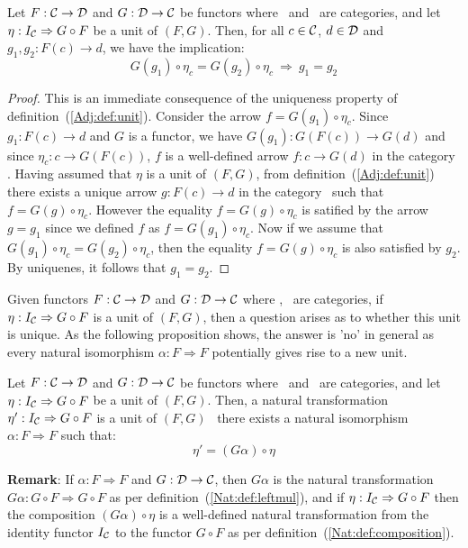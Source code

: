 \begin{prop}\label{Adj:prop:unit:proving:equality}
    Let $F:\mbox{$\cal C$}\to\mbox{$\cal D$}$ and $G:\mbox{$\cal D$}\to\mbox{$\cal C$}$ be functors where \Cat\ and \Dat\ 
    are categories, and let $\eta:I_{\cal C}\Rightarrow G\circ F$ be a unit 
    of $(F,G)$. Then, for all $c\in\mbox{$\cal C$}$, $d\in\mbox{$\cal D$}$ and $g_{1},g_{2}:F(c)\to d$,
    we have the implication:
        \[
            G(g_{1})\circ\eta_{c} = G(g_{2})\circ\eta_{c}\ 
            \Rightarrow\ 
            g_{1}=g_{2}
        \]
\end{prop}
\begin{proof}
    This is an immediate consequence of the uniqueness property of
    definition~(\ref{Adj:def:unit}). Consider the arrow 
    $f=G(g_{1})\circ\eta_{c}$. Since $g_{1}:F(c)\to d$ and $G$ is a 
    functor, we have 
    $G(g_{1}):G(F(c))\to G(d)$ and since $\eta_{c}:c\to G(F(c))$, $f$
    is a well-defined arrow $f:c\to G(d)$ in the category \Cat. Having
    assumed that $\eta$ is a unit of $(F,G)$, from 
    definition~(\ref{Adj:def:unit}) there exists a unique arrow 
    $g:F(c)\to d$ in the category \Dat\ such that $f=G(g)\circ\eta_{c}$.
    However the equality $f=G(g)\circ\eta_{c}$ is satified by the 
    arrow $g=g_{1}$ since we defined $f$ as $f=G(g_{1})\circ\eta_{c}$.
    Now if we assume that $G(g_{1})\circ\eta_{c}=G(g_{2})\circ\eta_{c}$,
    then the equality $f=G(g)\circ\eta_{c}$ is also satisfied by $g_{2}$.
    By uniquenes, it follows that $g_{1}=g_{2}$.
\end{proof}

Given functors $F:\mbox{$\cal C$}\to\mbox{$\cal D$}$ and $G:\mbox{$\cal D$}\to\mbox{$\cal C$}$ where \Cat, \Dat\ are 
categories, if $\eta:I_{\cal C}\Rightarrow G\circ F$ is a unit of $(F,G)$,
then a question arises as to whether this unit is unique. As the following
proposition shows, the answer is 'no' in general as every natural 
isomorphism $\alpha : F\Rightarrow F$ potentially gives rise to a 
new unit.

\begin{prop}\label{Adj:prop:unit:not:unique}
    Let $F:\mbox{$\cal C$}\to\mbox{$\cal D$}$ and $G:\mbox{$\cal D$}\to\mbox{$\cal C$}$ be functors where \Cat\ and \Dat\ 
    are categories, and let $\eta:I_{\cal C}\Rightarrow G\circ F$ be a unit
    of $(F,G)$. Then, a natural transformation $\eta':I_{\cal C}\Rightarrow 
    G\circ F$ is a unit of $(F,G)$ \ifand\ there exists a natural isomorphism 
    $\alpha:F\Rightarrow F$ such that:
        \[
            \eta'=(G\alpha)\circ\eta
        \]
\end{prop}

\noindent
{\bf Remark}: If $\alpha: F\Rightarrow F$ and $G:\mbox{$\cal D$}\to\mbox{$\cal C$}$, then $G\alpha$
is the natural transformation $G\alpha:G\circ F\Rightarrow G\circ F$ as per
definition~(\ref{Nat:def:leftmul}), and if $\eta:I_{\cal C}\Rightarrow G\circ F$
then the composition $(G\alpha)\circ\eta$ is a well-defined natural 
transformation from the identity functor $I_{\cal C}$ to the functor $G\circ F$ 
as per definition~(\ref{Nat:def:composition}).

